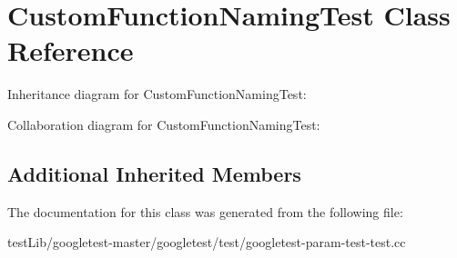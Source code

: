 \hypertarget{classCustomFunctionNamingTest}{}\section{Custom\+Function\+Naming\+Test Class Reference}
\label{classCustomFunctionNamingTest}


Inheritance diagram for Custom\+Function\+Naming\+Test\+:


Collaboration diagram for Custom\+Function\+Naming\+Test\+:
\subsection*{Additional Inherited Members}


The documentation for this class was generated from the following file\+:\begin{DoxyCompactItemize}
\item 
test\+Lib/googletest-\/master/googletest/test/googletest-\/param-\/test-\/test.\+cc\end{DoxyCompactItemize}
